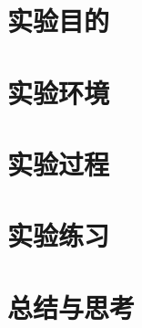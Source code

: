 \documentclass[UTF8,fontset=fandol]{ctexart}
\begin{document}
\section*{实验目的}
\section*{实验环境}
\section*{实验过程}
\begin{ExSteps}
  \step
\end{ExSteps}
\section*{实验练习}
\begin{ExQuestions}
  \question
\end{ExQuestions}
\section*{总结与思考}
\end{document}
